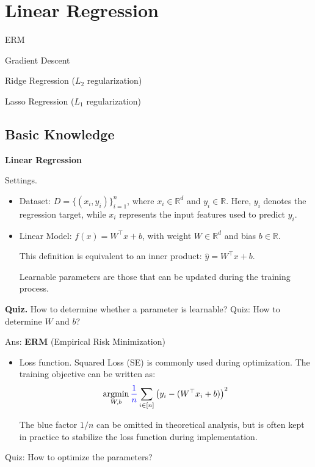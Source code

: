 \documentclass[../main]{subfiles}
\begin{document}
\chapter{Linear Regression}
\begin{introduction}
\item ERM
\item Gradient Descent
\item Ridge Regression ($L_2$ regularization)
\item Lasso Regression ($L_1$ regularization)
\end{introduction}
\section{Basic Knowledge}
\begin{example}
\textbf{Linear Regression}
\end{example}

{Settings.}
\begin{itemize}
  \item Dataset: $D=\{(x_i,y_i)\}_{i=1}^n$, where $x_i\in\mathbb{R}^d$ and $y_i\in\mathbb{R}$.  
  Here, $y_i$ denotes the regression target, while $x_i$ represents the input features used to predict $y_i$.

  \item Linear Model: $f(x)=W^{\top}x+b$, with weight $W\in\mathbb{R}^d$ and bias $b\in\mathbb{R}$.  
  \begin{note}
    This definition is equivalent to an inner product:  
    $\hat y = W^{\top}x+b.$
  \end{note}

  \begin{definition}
    Learnable parameters are those that can be updated during the training process.
  \end{definition}
\end{itemize}

\textbf{Quiz.} How to determine whether a parameter is learnable?
Quiz: How to determine $W$ and $b$?

\noindent Ans: \textbf{ERM} (Empirical Risk Minimization)

\begin{itemize}
  \item Loss function. Squared Loss (SE) is commonly used during optimization. The training objective can be written as:
    \begin{equation}
        \mathop{\mathrm{argmin}}_{W,b}{\color{blue}{\frac{1}{n}}}\sum_{i\in[n]}\left(y_i-(W^\top x_i+b)\right)^2
      \end{equation}
  
  The blue factor $1/n$ can be omitted in theoretical analysis, but is often kept in practice to stabilize the loss function during implementation.
\end{itemize}
Quiz: How to optimize the parameters?
\end{document}
